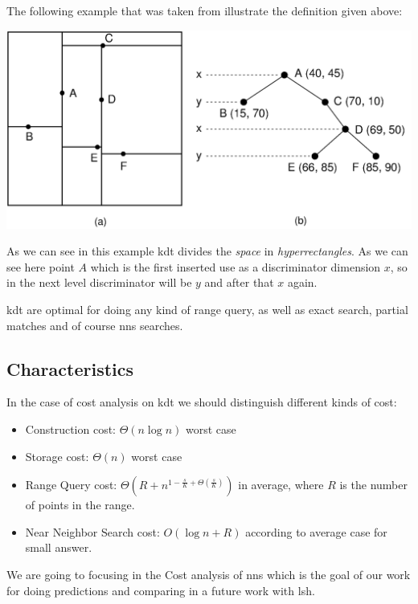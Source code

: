 \documentclass[12pt, a4paper]{article}
\begin{document}
The following example that was taken from \cite{vtech_page} illustrate the definition given above:

\begin{minipage}[t]{\linewidth}
  \includegraphics[width=\textwidth]{KDTree}
  \captionsetup{type=figure}
  \label{fig:kdtree_example}
\end{minipage}

As we can see in this example \acrshort{kdt} divides the \textit{space} in \textit{hyperrectangles}. As we can see here point $A$ which is the first inserted use as a discriminator dimension $x$, so in the next level discriminator will be $y$ and after that $x$ again.

\acrshort{kdt} are optimal for doing any kind of range query, as well as exact search, partial matches and of course \acrshort{nns} searches.

\subsection{Characteristics}
In the case of cost analysis on \acrshort{kdt} we should distinguish different kinds of cost:

\begin{itemize}
  \item Construction cost: $\Theta(n\log{n})$ worst case
  \item Storage cost: $\Theta(n)$ worst case
  \item Range Query cost: $\Theta(R + n^{1 - \frac{s}{K} + \Theta(\frac{s}{K})})$ in average, where $R$ is the number of points in the range.
  \item Near Neighbor Search cost: $O(\log{n} + R)$ according to \cite{fried} average case for small answer.
\end{itemize}

We are going to focusing in the Cost analysis of \acrshort{nns} which is the goal of our work for doing predictions and comparing in a future work with \acrshort{lsh}.
\end{document}
